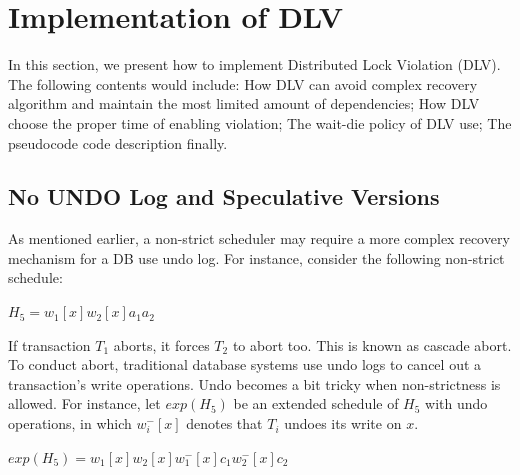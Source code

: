\documentclass[conference]{IEEEtran}
\begin{document}


\section{Implementation of DLV}
\label{sec:implement}

In this section, we present how to implement Distributed Lock Violation (DLV).
The following contents would include:
How DLV can avoid complex recovery algorithm and maintain the most limited amount of dependencies;
How DLV choose the proper time of enabling violation;
The wait-die policy of DLV use;
The pseudocode code description finally.

\subsection {No UNDO Log and Speculative Versions}

As mentioned earlier, a non-strict scheduler may require a more complex recovery mechanism for a DB use undo log.
For instance, consider the following non-strict schedule:

\begin{center}
${H_5 = w_1[x]w_2[x]a_1a_2}$
\end{center}

If transaction ${T_1}$ aborts, it forces ${T_2}$ to abort too.
This is known as cascade abort.
To conduct abort, traditional database systems use undo logs to cancel out a transaction's write operations.
Undo becomes a bit tricky when non-strictness is allowed.
For instance, let ${exp(H_5)}$ be an extended schedule of $H_5$ with undo operations,
in which ${w^-_i[x]}$ denotes that ${T_i}$ undoes its write on ${x}$.


\begin{center}
  ${exp(H_5) =  w_1[x]w_2[x]w^-_1[x]c_1w^-_2[x]c_2}$
\end{center}
\end{document}
